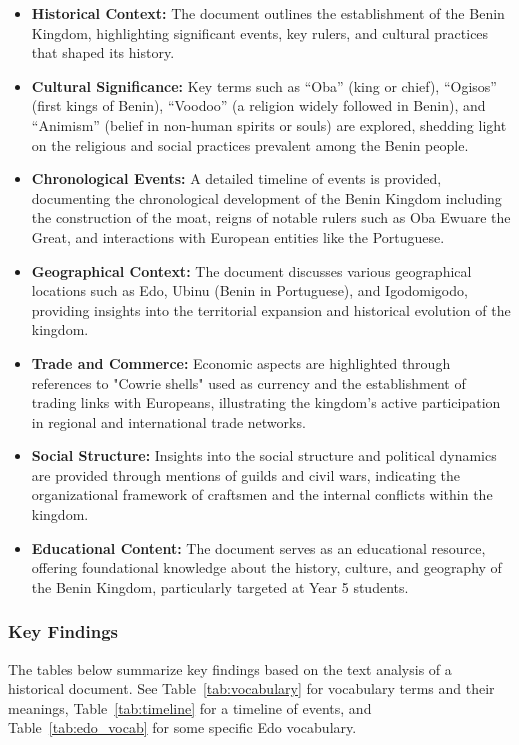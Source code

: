\begin{itemize}
  \item \textbf{Historical Context:} The document outlines the establishment of the Benin Kingdom, highlighting significant events, key rulers, and cultural practices that shaped its history.
  \item \textbf{Cultural Significance:} Key terms such as ``Oba'' (king or chief), ``Ogisos'' (first kings of Benin), ``Voodoo'' (a religion widely followed in Benin), and ``Animism'' (belief in non-human spirits or souls) are explored, shedding light on the religious and social practices prevalent among the Benin people.
  \item \textbf{Chronological Events:} A detailed timeline of events is provided, documenting the chronological development of the Benin Kingdom including the construction of the moat, reigns of notable rulers such as Oba Ewuare the Great, and interactions with European entities like the Portuguese.
  \item \textbf{Geographical Context:} The document discusses various geographical locations such as Edo, Ubinu (Benin in Portuguese), and Igodomigodo, providing insights into the territorial expansion and historical evolution of the kingdom.
  \item \textbf{Trade and Commerce:} Economic aspects are highlighted through references to "Cowrie shells" used as currency and the establishment of trading links with Europeans, illustrating the kingdom's active participation in regional and international trade networks.
  \item \textbf{Social Structure:} Insights into the social structure and political dynamics are provided through mentions of guilds and civil wars, indicating the organizational framework of craftsmen and the internal conflicts within the kingdom.
  \item \textbf{Educational Content:} The document serves as an educational resource, offering foundational knowledge about the history, culture, and geography of the Benin Kingdom, particularly targeted at Year 5 students.
\end{itemize}
\subsubsection{Key Findings}
The tables below summarize key findings based on the text analysis of a historical document. See Table~\ref{tab:vocabulary} for vocabulary terms and their meanings, Table~\ref{tab:timeline} for a timeline of events, and Table~\ref{tab:edo_vocab} for some specific Edo vocabulary.

